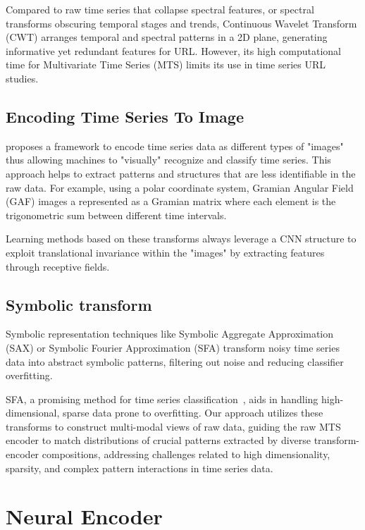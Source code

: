 Compared to raw time series that collapse spectral features, or spectral transforms obscuring temporal stages and trends, Continuous Wavelet Transform (CWT) arranges temporal and spectral patterns in a 2D plane, generating informative yet redundant features for URL. However, its high computational time for Multivariate Time Series (MTS) limits its use in time series URL studies.

\subsection{Encoding Time Series To Image}\label{sec:imag}

\cite{wang2015encoding} proposes a framework to encode time series data as different types of "images" thus allowing machines to "visually" recognize and classify time series. This approach helps to extract patterns and structures that are less identifiable in the raw data. For example, using a polar coordinate system, Gramian Angular Field (GAF) images a represented as a Gramian matrix where each element is the trigonometric sum between different time intervals.   

Learning methods based on these transforms always leverage a CNN structure to exploit translational invariance within the "images" by extracting features through receptive fields.

\subsection{Symbolic transform}

Symbolic representation techniques like Symbolic Aggregate Approximation (SAX)\cite{notaristefano2013data} or Symbolic Fourier Approximation (SFA)\cite{schafer2012sfa} transform noisy time series data into abstract symbolic patterns, filtering out noise and reducing classifier overfitting.

SFA, a promising method for time series classification~\cite{tang2020interpretable}, aids in handling high-dimensional, sparse data prone to overfitting. Our approach utilizes these transforms to construct multi-modal views of raw data, guiding the raw MTS encoder to match distributions of crucial patterns extracted by diverse transform-encoder compositions, addressing challenges related to high dimensionality, sparsity, and complex pattern interactions in time series data.

\section{Neural Encoder}\label{sec:neur_encoder}

